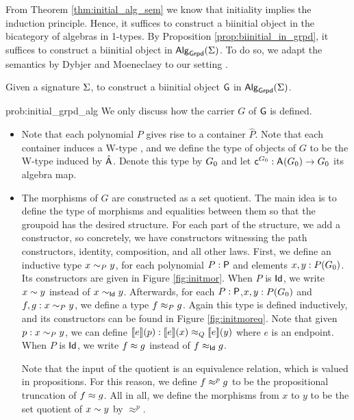 From Theorem \ref{thm:initial_alg_sem} we know that initiality implies the induction principle.
Hence, it suffices to construct a biinitial object in the bicategory of algebras in 1-types.
By Proposition \ref{prop:biinitial_in_grpd}, it suffices to construct a biinitial object in $\algG{\sign}$.
To do so, we adapt the semantics by Dybjer and Moeneclaey to our setting \cite{DBLP:journals/entcs/DybjerM18}.

\begin{problem}
\label{prob:initial_grpd_alg}
Given a signature $\sign$, to construct a biinitial object  $\constfont{G}$ in $\algG{\sign}$.
\end{problem}

\begin{construction}{prob:initial_grpd_alg}
\label{constr:initial_grpd_alg}
We only discuss how the carrier $G$ of $\constfont{G}$ is defined.
\begin{itemize}
	\item Note  that each polynomial $P$ gives rise to a container $\hat{P}$.
	Note that each container induces a W-type \cite{abbott2003categories},
	and we define the type of objects of $G$ to be the W-type induced by $\hat{\pointconstr}$.
	Denote this type by $\initob$ and let $\constfont{c}^{\initob} : \pointconstr(\initob) \to \initob$ its algebra map.
	\item The morphisms of $G$ are constructed as a set quotient.
	The main idea is to define the type of morphisms and equalities between them so that the groupoid has the desired structure.
	For each part of the structure, we add a constructor, so concretely, we have constructors witnessing the path constructors, identity, composition, and all other laws.
	First, we define an inductive type $\initmorgen{P}{x}{y}$, for each polynomial $P :\poly$ and elements $x, y : P (\initob)$. Its constructors are given in Figure \ref{fig:initmor}.
    When $P$ is $\idP$, we write $\initmor{x}{y}$ instead of $\initmorgen{\idP}{x}{y}$.
	Afterwards, for each $P:\poly$,$x, y : P(\initob)$ and $f, g : \initmorgen{P}{x}{y}$, we define a type $\initeqgen{P}{f}{g}$.
	Again this type is defined inductively, and its constructors can be found in Figure \ref{fig:initmoreq}.
	Note that given $p : \initmorgen{P}{x}{y}$, we can define $\semE{e}(p) : \initeqgen{Q}{\semE{e}(x)}{\semE{e}(y)}$ where $e$ is an endpoint. When $P$ is $\idP$, we write $\initeq{f}{g}$ instead of $\initeqgen{\idP}{f}{g}$.
	
	Note that the input of the quotient is an equivalence relation, which is valued in propositions.
	For this reason, we define $\initeqprop{f}{g}$ to be the propositional truncation of $\initeq{f}{g}$.
	All in all, we define the morphisms from $x$ to $y$ to be the set quotient of $\initmor{x}{y}$ by $\approx^p$.
	\qedhere	
\end{itemize}
\end{construction}

